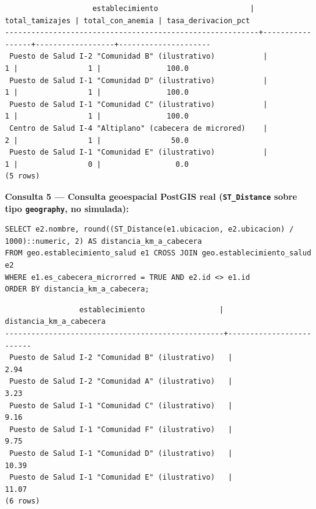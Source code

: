 \documentclass[11pt,a4paper]{article}
\begin{document}
\begin{samepage}\begin{verbatim}
                    establecimiento                     | total_tamizajes | total_con_anemia | tasa_derivacion_pct
----------------------------------------------------------+-----------------+------------------+---------------------
 Puesto de Salud I-2 "Comunidad B" (ilustrativo)           |               1 |                1 |               100.0
 Puesto de Salud I-1 "Comunidad D" (ilustrativo)           |               1 |                1 |               100.0
 Puesto de Salud I-1 "Comunidad C" (ilustrativo)           |               1 |                1 |               100.0
 Centro de Salud I-4 "Altiplano" (cabecera de microred)    |               2 |                1 |                50.0
 Puesto de Salud I-1 "Comunidad E" (ilustrativo)           |               1 |                0 |                 0.0
(5 rows)
\end{verbatim}\end{samepage}

\textbf{Consulta 5 --- Consulta geoespacial PostGIS real (\texttt{ST\_Distance} sobre tipo \texttt{geography}, no simulada):}

\begin{samepage}\begin{verbatim}
SELECT e2.nombre, round((ST_Distance(e1.ubicacion, e2.ubicacion) / 1000)::numeric, 2) AS distancia_km_a_cabecera
FROM geo.establecimiento_salud e1 CROSS JOIN geo.establecimiento_salud e2
WHERE e1.es_cabecera_microrred = TRUE AND e2.id <> e1.id
ORDER BY distancia_km_a_cabecera;
\end{verbatim}\end{samepage}

\begin{samepage}\begin{verbatim}
                 establecimiento                 | distancia_km_a_cabecera
--------------------------------------------------+-------------------------
 Puesto de Salud I-2 "Comunidad B" (ilustrativo)   |                    2.94
 Puesto de Salud I-2 "Comunidad A" (ilustrativo)   |                    3.23
 Puesto de Salud I-1 "Comunidad C" (ilustrativo)   |                    9.16
 Puesto de Salud I-1 "Comunidad F" (ilustrativo)   |                    9.75
 Puesto de Salud I-1 "Comunidad D" (ilustrativo)   |                   10.39
 Puesto de Salud I-1 "Comunidad E" (ilustrativo)   |                   11.07
(6 rows)
\end{verbatim}\end{samepage}
\end{document}

